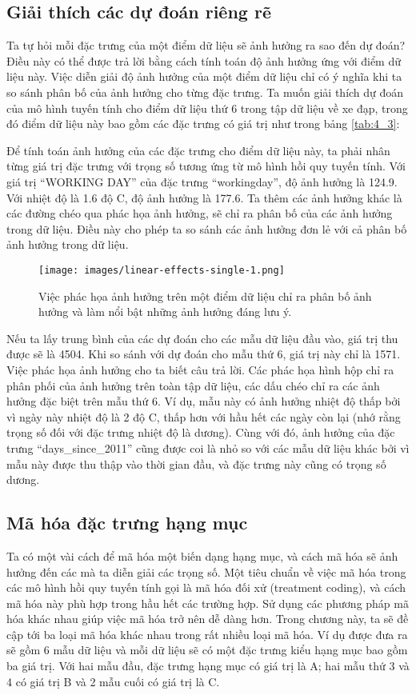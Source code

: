 \subsection{Giải thích các dự đoán riêng rẽ}
Ta tự hỏi mỗi đặc trưng của một điểm dữ liệu sẽ ảnh hưởng ra sao đến dự đoán? Điều này có thể được trả lời bằng cách tính toán độ ảnh hưởng ứng với điểm dữ liệu này. Việc diễn giải độ ảnh hưởng của một điểm dữ liệu chỉ có ý nghĩa khi ta so sánh phân bố của ảnh hưởng cho từng đặc trưng. Ta muốn giải thích dự đoán của mô hình tuyến tính cho điểm dữ liệu thứ 6 trong tập dữ liệu về xe đạp, trong đó điểm dữ liệu này bao gồm các đặc trưng có giá trị như trong bảng \ref{tab:4_3}:

Để tính toán ảnh hưởng của các đặc trưng cho điểm dữ liệu này, ta phải nhân từng giá trị đặc trưng với trọng số tương ứng từ mô hình hồi quy tuyến tính. Với giá trị ``WORKING DAY'' của đặc trưng ``workingday'', độ ảnh hưởng là 124.9. Với nhiệt độ là 1.6 độ C, độ ảnh hưởng là 177.6. Ta thêm các ảnh hưởng khác là các đường chéo qua phác họa ảnh hưởng, sẽ chỉ ra phân bố của các ảnh hưởng trong dữ liệu. Điều này cho phép ta so sánh các ảnh hưởng đơn lẻ với cả phân bố ảnh hưởng trong dữ liệu.

\begin{figure*}[h!]
	\centering
	\texttt{[image: images/linear-effects-single-1.png]}
	\label{fig:4_1_4}
	\caption{Việc phác họa ảnh hưởng trên một điểm dữ liệu chỉ ra phân bố ảnh hưởng và làm nổi bật những ảnh hưởng đáng lưu ý.}
\end{figure*}

Nếu ta lấy trung bình của các dự đoán cho các mẫu dữ liệu đầu vào, giá trị thu được sẽ là 4504. Khi so sánh với dự đoán cho mẫu thứ 6, giá trị này chỉ là 1571. Việc phác họa ảnh hưởng cho ta biết câu trả lời. Các phác họa hình hộp chỉ ra phân phối của ảnh hưởng trên toàn tập dữ liệu, các dấu chéo chỉ ra các ảnh hưởng đặc biệt trên mẫu thứ 6. Ví dụ, mẫu này có ảnh hưởng nhiệt độ thấp bởi vì ngày này nhiệt độ là 2 độ C, thấp hơn với hầu hết các ngày còn lại (nhớ rằng trọng số đối với đặc trưng nhiệt độ là dương). Cùng với đó, ảnh hưởng của đặc trưng ``days\_since\_2011'' cũng được coi là nhỏ so với các mẫu dữ liệu khác bởi vì mẫu này được thu thập vào thời gian đầu, và đặc trưng này cũng có trọng số dương.

\subsection{Mã hóa đặc trưng hạng mục}\label{encoding_cat_features}
Ta có một vài cách để mã hóa một biến dạng hạng mục, và cách mã hóa sẽ ảnh hưởng đến các mà ta diễn giải các trọng số. Một tiêu chuẩn về việc mã hóa trong các mô hình hồi quy tuyến tính gọi là mã hóa đối xử (treatment coding), và cách mã hóa này phù hợp trong hầu hết các trường hợp. Sử dụng các phương pháp mã hóa khác nhau giúp việc mã hóa trở nên dễ dàng hơn. Trong chương này, ta sẽ đề cập tới ba loại mã hóa khác nhau trong rất nhiều loại mã hóa. Ví dụ được đưa ra sẽ gồm 6 mẫu dữ liệu và mỗi dữ liệu sẽ có một đặc trưng kiểu hạng mục bao gồm ba giá trị. Với hai mẫu đầu, đặc trưng hạng mục có giá trị là A; hai mẫu thứ 3 và 4 có giá trị B và 2 mẫu cuối có giá trị là C.

